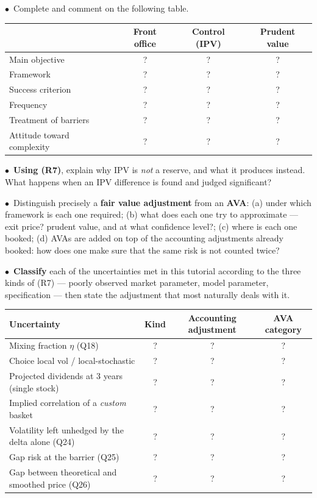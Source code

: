 \documentclass[11pt,a4paper]{article}
\newcommand{\team}{\textcolor{teamblue}{$\bullet$}}
\begin{document}
\begin{questions}[resume]
  \item \team\ Complete and comment on the following table.
  \begin{center}
  \small
  \begin{tabular}{@{}l c c c@{}}
  \toprule
  & \textbf{Front office} & \textbf{Control (IPV)} & \textbf{Prudent value} \\
  \midrule
  Main objective & ? & ? & ? \\
  Framework & ? & ? & ? \\
  Success criterion & ? & ? & ? \\
  Frequency & ? & ? & ? \\
  Treatment of barriers & ? & ? & ? \\
  Attitude toward complexity & ? & ? & ? \\
  \bottomrule
  \end{tabular}
  \end{center}

  \item \team\ \textbf{Using (R7)}, explain why IPV is \emph{not} a reserve, and what it produces instead. What happens
  when an IPV difference is found and judged significant?

  \item \team\ Distinguish precisely a \textbf{fair value adjustment} from an \textbf{AVA}: (a) under which framework
  is each one required; (b) what does each one try to approximate --- exit price? prudent value,
  and at what confidence level?; (c) where is each one booked; (d) AVAs are added on top of
  the accounting adjustments already booked: how does one make sure that the same risk is not
  counted twice?

  \item \team\ \textbf{Classify} each of the uncertainties met in this tutorial according to the three kinds of (R7) ---
  poorly observed market parameter, model parameter, specification --- then state the adjustment
  that most naturally deals with it.
  \begin{center}
  \small
  \begin{tabularx}{\linewidth}{@{}>{\raggedright\arraybackslash}X c c c@{}}
  \toprule
  Uncertainty & Kind & Accounting adjustment & AVA category \\
  \midrule
  Mixing fraction $\eta$ (Q18) & ? & ? & ? \\
  Choice local vol / local-stochastic & ? & ? & ? \\
  Projected dividends at 3 years (single stock) & ? & ? & ? \\
  Implied correlation of a \emph{custom} basket & ? & ? & ? \\
  Volatility left unhedged by the delta alone (Q24) & ? & ? & ? \\
  Gap risk at the barrier (Q25) & ? & ? & ? \\
  Gap between theoretical and smoothed price (Q26) & ? & ? & ? \\
  \bottomrule
  \end{tabularx}
  \end{center}


\end{questions}
\end{document}
